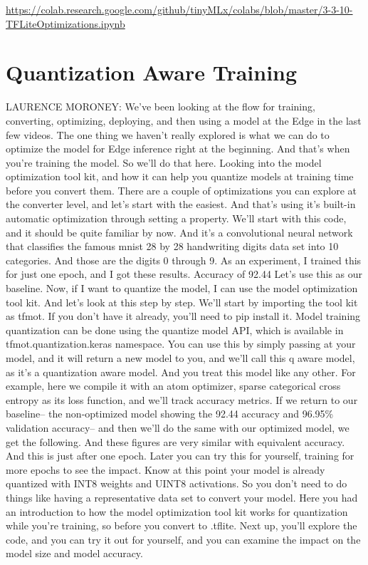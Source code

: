 \url{https://colab.research.google.com/github/tinyMLx/colabs/blob/master/3-3-10-TFLiteOptimizations.ipynb}


\section{Quantization Aware Training}

LAURENCE MORONEY: We've been looking at the flow for training, converting,
optimizing, deploying, and then using a model
at the Edge in the last few videos.
The one thing we haven't really explored is
what we can do to optimize the model for Edge inference right at the beginning.
And that's when you're training the model.
So we'll do that here.
Looking into the model optimization tool kit, and how it can help
you quantize models at training time before you convert them.
There are a couple of optimizations you can explore at the converter level,
and let's start with the easiest.
And that's using it's built-in automatic optimization
through setting a property.
We'll start with this code, and it should be quite familiar by now.
And it's a convolutional neural network that
classifies the famous mnist 28 by 28 handwriting digits
data set into 10 categories.
And those are the digits 0 through 9.
As an experiment, I trained this for just one epoch,
and I got these results.
Accuracy of 92.44%
Let's use this as our baseline.
Now, if I want to quantize the model, I can use the model optimization tool
kit.
And let's look at this step by step.
We'll start by importing the tool kit as tfmot.
If you don't have it already, you'll need to pip install it.
Model training quantization can be done using the quantize model
API, which is available in tfmot.quantization.keras namespace.
You can use this by simply passing at your model,
and it will return a new model to you, and we'll call this q aware model,
as it's a quantization aware model.
And you treat this model like any other.
For example, here we compile it with an atom optimizer,
sparse categorical cross entropy as its loss function,
and we'll track accuracy metrics.
If we return to our baseline-- the non-optimized model showing the 92.44%
accuracy and 96.95\% validation accuracy--
and then we'll do the same with our optimized model, we get the following.
And these figures are very similar with equivalent accuracy.
And this is just after one epoch.
Later you can try this for yourself, training for more epochs
to see the impact.
Know at this point your model is already quantized with INT8 weights and UINT8
activations.
So you don't need to do things like having a representative data set
to convert your model.
Here you had an introduction to how the model optimization tool kit works
for quantization while you're training, so before you convert to .tflite.
Next up, you'll explore the code, and you can try it out for yourself,
and you can examine the impact on the model size and model accuracy.

